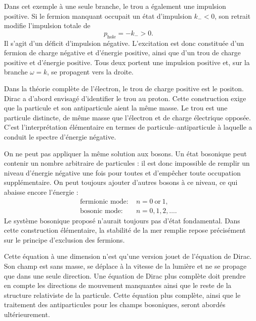 Dans cet exemple à une seule branche, le trou a également une impulsion positive. Si le fermion manquant occupait un état d’impulsion \(k_-<0\), son retrait modifie l’impulsion totale de
\begin{equation}
p_{\mathrm{hole}}=-k_->0.
\end{equation}
Il s’agit d’un déficit d’impulsion négative. L’excitation est donc constituée d’un fermion de charge négative et d’énergie positive, ainsi que d’un trou de charge positive et d’énergie positive. Tous deux portent une impulsion positive et, sur la branche \(\omega=k\), se propagent vers la droite.

Dans la théorie complète de l’électron, le trou de charge positive est le positon. Dirac a d’abord envisagé d’identifier le trou au proton. Cette construction exige que la particule et son antiparticule aient la même masse. Le trou est une particule distincte, de même masse que l’électron et de charge électrique opposée. C’est l’interprétation élémentaire en termes de particule--antiparticule à laquelle a conduit le spectre d’énergie négative.

On ne peut pas appliquer la même solution aux bosons. Un état bosonique peut contenir un nombre arbitraire de particules : il est donc impossible de remplir un niveau d’énergie négative une fois pour toutes et d’empêcher toute occupation supplémentaire. On peut toujours ajouter d’autres bosons à ce niveau, ce qui abaisse encore l’énergie :
\begin{equation}
\begin{aligned}
\text{fermionic mode: }&n=0\ \text{or}\ 1,\\
\text{bosonic mode: }&n=0,1,2,\ldots .
\end{aligned}
\end{equation}
Le système bosonique proposé n’aurait toujours pas d’état fondamental. Dans cette construction élémentaire, la stabilité de la mer remplie repose précisément sur le principe d’exclusion des fermions.

Cette équation à une dimension n’est qu’une version jouet de l’équation de Dirac. Son champ est sans masse, se déplace à la vitesse de la lumière et ne se propage que dans une seule direction. Une équation de Dirac plus complète doit prendre en compte les directions de mouvement manquantes ainsi que le reste de la structure relativiste de la particule. Cette équation plus complète, ainsi que le traitement des antiparticules pour les champs bosoniques, seront abordés ultérieurement.
